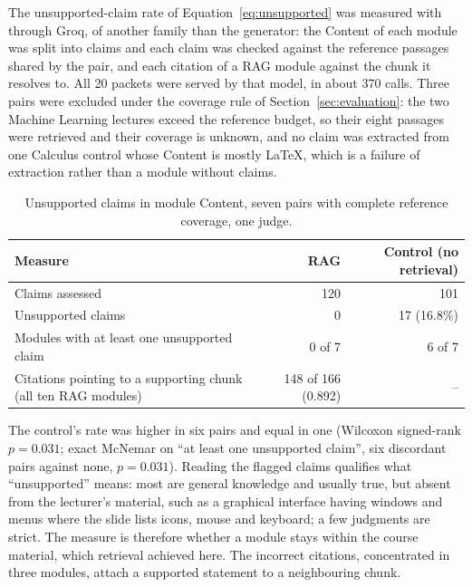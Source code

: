 The unsupported-claim rate of Equation~\ref{eq:unsupported} was measured with  through Groq, of another family than the generator: the Content of each module was split into claims and each claim was checked against the reference passages shared by the pair, and each citation of a RAG module against the chunk it resolves to. All 20 packets were served by that model, in about 370 calls. Three pairs were excluded under the coverage rule of Section~\ref{sec:evaluation}: the two Machine Learning lectures exceed the reference budget, so their eight passages were retrieved and their coverage is unknown, and no claim was extracted from one Calculus control whose Content is mostly LaTeX, which is a failure of extraction rather than a module without claims.
\begin{table}[H]\centering\small\caption{Unsupported claims in module Content, seven pairs with complete reference coverage, one judge.}\label{tab:module-claims}
\begin{tabularx}{\linewidth}{|Y|r|r|}\hline
Measure & RAG & Control (no retrieval)\\\hline
Claims assessed & 120 & 101\\\hline
Unsupported claims & 0 & 17 (16.8\%)\\\hline
Modules with at least one unsupported claim & 0 of 7 & 6 of 7\\\hline
Citations pointing to a supporting chunk (all ten RAG modules) & 148 of 166 (0.892) & --\\\hline
\end{tabularx}\end{table}
The control's rate was higher in six pairs and equal in one (Wilcoxon signed-rank $p=0.031$; exact McNemar on ``at least one unsupported claim'', six discordant pairs against none, $p=0.031$). Reading the flagged claims qualifies what ``unsupported'' means: most are general knowledge and usually true, but absent from the lecturer's material, such as a graphical interface having windows and menus where the slide lists icons, mouse and keyboard; a few judgments are strict. The measure is therefore whether a module stays within the course material, which retrieval achieved here. The incorrect citations, concentrated in three modules, attach a supported statement to a neighbouring chunk.

